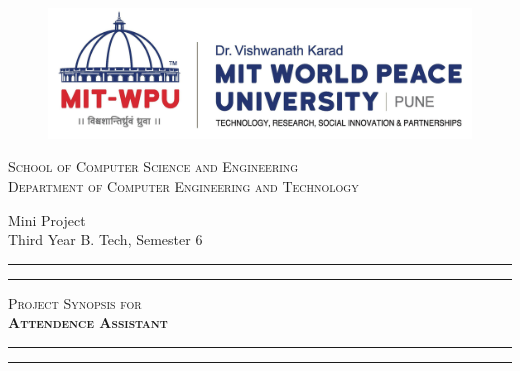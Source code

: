 \documentclass[11pt]{article}
\begin{document}
\begin{titlepage}
    \centering


    \begin{figure}[H]
        \centering
        \includegraphics[width=.75\textwidth]{mitwpu.jpg}
    \end{figure}

    \huge\textsc{
        School of Computer Science and Engineering\\
    }
    \vspace{0.75\baselineskip}
    \Large\textsc{
        Department of Computer Engineering and Technology
    }\\
        \vspace{0.75\baselineskip} %

    \LARGE{
        Mini Project\\
        Third Year B. Tech, Semester 6
    }

    \vfill %


    \rule{\textwidth}{1.6pt}\vspace*{-\baselineskip}\vspace*{2pt}
    \rule{\textwidth}{0.6pt}
    \vspace{0.75\baselineskip} %



    \huge{\textsc{
        Project Synopsis for\\
        \textbf{Attendence Assistant}
        }} \\



    \vspace{0.5\baselineskip} %
    \rule{\textwidth}{0.6pt}\vspace*{-\baselineskip}\vspace*{2.8pt}
    \rule{\textwidth}{1.6pt}

    \vspace{1\baselineskip} %


\end{titlepage}
\end{document}
